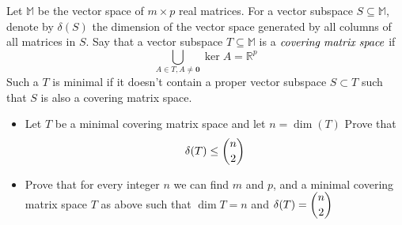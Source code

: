 Let $\mathbb{M}$ be the vector space of $m \times p$ real matrices. For a vector subspace $S\subseteq \mathbb{M}$, denote by $\delta(S)$ the dimension of the vector space generated by all columns of all matrices in $S$.
Say that a vector subspace $T\subseteq \mathbb{M}$ is a $\emph{covering matrix space}$ if
\[ \bigcup_{A\in T, A\ne \mathbf{0}} \ker A =\mathbb{R}^p \]
Such a $T$ is minimal if it doesn't contain a proper vector subspace $S\subset T$ such that $S$ is also a covering matrix space.
\begin{itemize}
  \item Let $T$ be a minimal covering matrix space and let $n=\dim (T)$
Prove that
\[ \delta(T)\le \dbinom{n}{2} \]
  \item Prove that for every integer $n$ we can find $m$ and $p$, and a minimal covering matrix space $T$ as above such that $\dim T=n$ and $\delta(T)=\dbinom{n}{2}$
\end{itemize}
